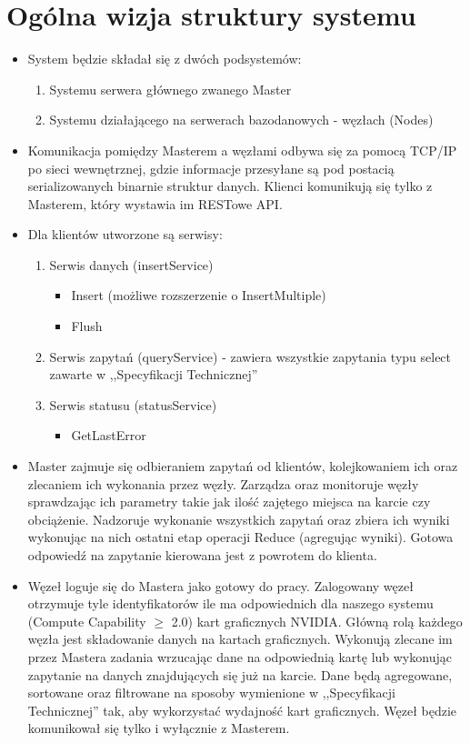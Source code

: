 \documentclass[paper=a4, fontsize=11pt]{scrartcl} %
\numberwithin{equation}{section} %
\numberwithin{figure}{section} %
\numberwithin{table}{section} %
\begin{document}
\section{Ogólna wizja struktury systemu}
\begin{itemize}
	\item System będzie składał się z dwóch podsystemów:
		\begin{enumerate}
			\item Systemu serwera głównego zwanego Master
			\item Systemu działającego na serwerach bazodanowych - węzłach (Nodes)
		\end{enumerate}
	\item Komunikacja pomiędzy Masterem a węzłami odbywa się za pomocą TCP/IP po sieci wewnętrznej, gdzie informacje przesyłane są pod postacią
		serializowanych binarnie struktur danych. Klienci komunikują się tylko z Masterem, który wystawia im RESTowe API. 
	\item Dla klientów utworzone są serwisy:
		\begin{enumerate}
			\item Serwis danych (insertService)
				\begin{itemize}
					\item Insert (możliwe rozszerzenie o InsertMultiple)
					\item Flush
				\end{itemize}
			\item Serwis zapytań (queryService) - zawiera wszystkie zapytania typu select zawarte w ,,Specyfikacji Technicznej''
			\item Serwis statusu (statusService)
				\begin{itemize}
					\item GetLastError
				\end{itemize}
		\end{enumerate}
	\item Master zajmuje się odbieraniem zapytań od klientów, kolejkowaniem ich oraz zlecaniem ich wykonania przez węzły. Zarządza oraz monitoruje 
		węzły sprawdzając ich parametry takie jak ilość zajętego miejsca na karcie czy obciążenie. Nadzoruje wykonanie wszystkich zapytań oraz zbiera ich wyniki 
		wykonując na nich ostatni etap operacji Reduce (agregując wyniki). Gotowa odpowiedź na zapytanie kierowana jest z powrotem do klienta.
	\item Węzeł loguje się do Mastera jako gotowy do pracy. Zalogowany węzeł otrzymuje tyle identyfikatorów ile ma odpowiednich dla naszego systemu 
		(Compute Capability $\geq$ 2.0) kart graficznych NVIDIA. Główną rolą każdego węzła jest składowanie danych na kartach graficznych. Wykonują zlecane im przez Mastera
		zadania wrzucając dane na odpowiednią kartę lub wykonując zapytanie na danych znajdujących się już na karcie. Dane będą agregowane, sortowane oraz filtrowane na sposoby wymienione w ,,Specyfikacji Technicznej'' tak, aby wykorzystać wydajność kart graficznych. Węzeł będzie komunikował się tylko i wyłącznie z Masterem.
\end{itemize}
\end{document}
